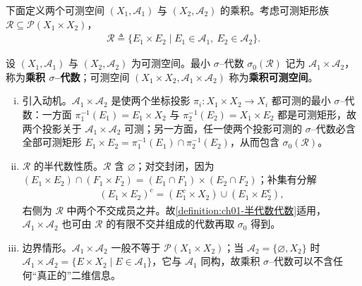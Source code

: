 \documentclass[../../main.tex]{subfiles}%
\begin{document}
下面定义两个可测空间 $(X_1,\mathcal{A}_1)$ 与 $(X_2,\mathcal{A}_2)$ 的乘积。考虑可测矩形族 $\mathcal{R}\subseteq\mathcal{P}(X_1\times X_2)$，
\begin{align*}
\mathcal{R}\triangleq\{E_1\times E_2\mid E_1\in\mathcal{A}_1,\ E_2\in\mathcal{A}_2\}.
\end{align*}

\begin{definition}\label{definition:ch01-乘积sigma代数}
设 $(X_1,\mathcal{A}_1)$ 与 $(X_2,\mathcal{A}_2)$ 为可测空间。最小 $\sigma$--代数 $\sigma_0(\mathcal{R})$ 记为 $\mathcal{A}_1\times\mathcal{A}_2$，称为\textbf{乘积 $\sigma$--代数}；可测空间 $(X_1\times X_2,\mathcal{A}_1\times\mathcal{A}_2)$ 称为\textbf{乘积可测空间}。
\end{definition}

\begin{remark}\label{remark:ch01-乘积sigma代数}
\begin{enumerate}[(i)]
\item 引入动机。$\mathcal{A}_1\times\mathcal{A}_2$ 是使两个坐标投影 $\pi_i:X_1\times X_2\to X_i$ 都可测的最小 $\sigma$--代数：一方面 $\pi_1^{-1}(E_1)=E_1\times X_2$ 与 $\pi_2^{-1}(E_2)=X_1\times E_2$ 都是可测矩形，故两个投影关于 $\mathcal{A}_1\times\mathcal{A}_2$ 可测；另一方面，任一使两个投影可测的 $\sigma$--代数必含全部可测矩形 $E_1\times E_2=\pi_1^{-1}(E_1)\cap\pi_2^{-1}(E_2)$，从而包含 $\sigma_0(\mathcal{R})$。
\item $\mathcal{R}$ 的半代数性质。$\mathcal{R}$ 含 $\varnothing$；对交封闭，因为 $(E_1\times E_2)\cap(F_1\times F_2)=(E_1\cap F_1)\times(E_2\cap F_2)$；补集有分解
\begin{align*}
(E_1\times E_2)^c=(E_1^c\times X_2)\cup(E_1\times E_2^c),
\end{align*}
右侧为 $\mathcal{R}$ 中两个不交成员之并。故\cref{definition:ch01-半代数代数}适用，$\mathcal{A}_1\times\mathcal{A}_2$ 也可由 $\mathcal{R}$ 的有限不交并组成的代数再取 $\sigma_0$ 得到。
\item 边界情形。$\mathcal{A}_1\times\mathcal{A}_2$ 一般不等于 $\mathcal{P}(X_1\times X_2)$；当 $\mathcal{A}_2=\{\varnothing,X_2\}$ 时 $\mathcal{A}_1\times\mathcal{A}_2=\{E\times X_2\mid E\in\mathcal{A}_1\}$，它与 $\mathcal{A}_1$ 同构，故乘积 $\sigma$--代数可以不含任何“真正的”二维信息。
\end{enumerate}
\end{remark}
\end{document}
